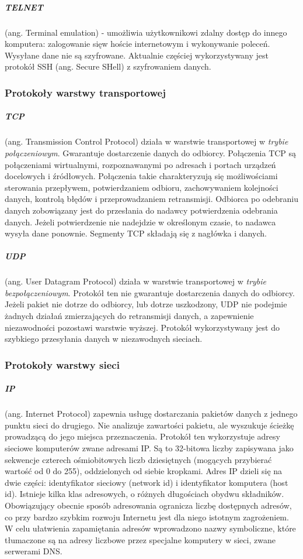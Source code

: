 \documentclass[a4paper,twoside]{report}
\begin{document}
\subparagraph{TELNET} (ang. Terminal emulation) - umożliwia użytkownikowi zdalny dostęp do innego komputera: zalogowanie sięw hoście internetowym i wykonywanie poleceń. Wysyłane dane nie są szyfrowane. Aktualnie częściej wykorzystywany jest protokół SSH (ang. Secure SHell) z szyfrowaniem danych.



\subsubsection{Protokoły warstwy transportowej}

\medskip 
\subparagraph{TCP} (ang. Transmission   Control   Protocol)   działa   w   warstwie transportowej   w   \emph{trybie połączeniowym}.  Gwarantuje dostarczenie danych do odbiorcy.  Połączenia  TCP  są  połączeniami  wirtualnymi,  rozpoznawanymi  po  adresach  i portach urządzeń  docelowych  i źródłowych.  Połączenia  takie  charakteryzują  się  możliwościami  sterowania przepływem,    potwierdzaniem    odbioru,    zachowywaniem    kolejności    danych,    kontrolą    błędów    i przeprowadzaniem  retransmisji. Odbiorca po odebraniu danych zobowiązany jest do przesłania do nadawcy potwierdzenia odebrania danych. Jeżeli potwierdzenie nie nadejdzie w określonym czasie, to nadawca wysyła dane ponownie.  Segmenty  TCP  składają  się  z  nagłówka  i  danych.

\subparagraph{UDP} (ang. User   Datagram   Protocol)   działa    w    warstwie    transportowej   w   \emph{trybie bezpołączeniowym}.  Protokół  ten  nie  gwarantuje  dostarczenia  danych  do  odbiorcy.  Jeżeli  pakiet  nie dotrze  do  odbiorcy,  lub  dotrze  uszkodzony,  UDP  nie podejmie żadnych  działań  zmierzających  do retransmisji  danych,  a  zapewnienie  niezawodności  pozostawi  warstwie  wyższej.   Protokół wykorzystywany jest do szybkiego przesyłania danych w niezawodnych sieciach. 




\subsubsection{Protokoły warstwy sieci}

\medskip 
\subparagraph{IP} (ang. Internet Protocol) zapewnia usługę dostarczania pakietów danych z jednego punktu sieci do drugiego. Nie analizuje zawartości pakietu, ale wyszukuje ścieżkę prowadzącą do jego miejsca przeznaczenia. Protokół ten wykorzystuje adresy sieciowe komputerów zwane adresami IP. Są to 32-bitowa liczby zapisywana jako sekwencje czterech ośmiobitowych liczb dziesiętnych (mogących przybierać wartość od 0 do 255), oddzielonych od siebie kropkami. Adres IP dzieli się na dwie części: identyfikator sieciowy (network id) i identyfikator komputera (host id). Istnieje kilka klas adresowych, o różnych długościach obydwu składników. Obowiązujący obecnie sposób adresowania ogranicza liczbę dostępnych adresów, co przy bardzo szybkim rozwoju Internetu jest dla niego istotnym zagrożeniem. W celu ułatwienia zapamiętania adresów wprowadzono nazwy symboliczne, które tłumaczone są na adresy liczbowe przez specjalne komputery w sieci, zwane serwerami DNS.
\end{document}
